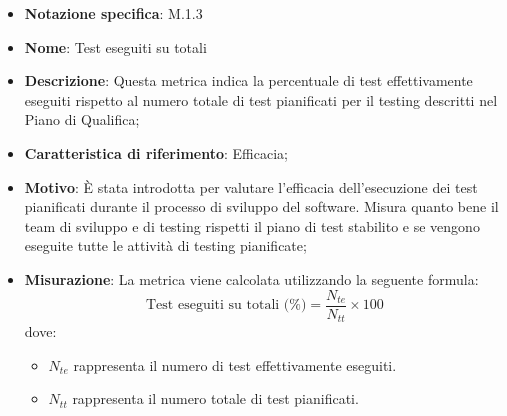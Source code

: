 \begin{itemize}
    \item \textbf{Notazione specifica}: M.1.3
    \item \textbf{Nome}: Test eseguiti su totali
    \item \textbf{Descrizione}: Questa metrica indica la percentuale di test effettivamente eseguiti rispetto al numero totale di test pianificati per il testing descritti nel Piano di Qualifica;
    \item \textbf{Caratteristica di riferimento}: Efficacia;
    \item \textbf{Motivo}: È stata introdotta per valutare l'efficacia dell'esecuzione dei test pianificati durante il processo di sviluppo del software. Misura quanto bene il team di sviluppo e di testing rispetti il piano di test stabilito e se vengono eseguite tutte le attività di testing pianificate;
    \item \textbf{Misurazione}: La metrica viene calcolata utilizzando la seguente formula:
    \[
    \text{Test eseguiti su totali (\%)} = \frac{N_{te}}{N_{tt}} \times 100
    \]
    dove:
    \begin{itemize}
        \item $N_{te}$ rappresenta il numero di test effettivamente eseguiti.
        \item $N_{tt}$ rappresenta il numero totale di test pianificati.
    \end{itemize}

\end{itemize}
